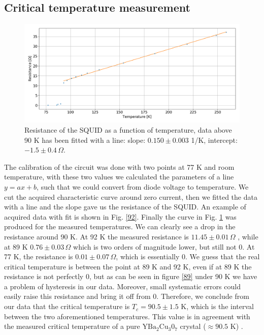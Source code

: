\documentclass[a4paper,10pt]{article}
\begin{document}
\subsection{Critical temperature measurement}
\begin{figure}[H]
\centering
\includegraphics[width = \textwidth]{img/tempR.png}
\caption{Resistance of the SQUID as a function of temperature, data above 90 K has been fitted with a line: slope: $0.150\pm 0.003$ 1/K, intercept: $-1.5\pm0.4\,\Omega$.}\label{resistance}
\end{figure}
The calibration of the circuit was done with two points at 77 K and room temperature, with these two values we calculated the parameters of a line $y=ax+b$, such that we could convert from diode voltage to temperature. We cut the acquired characteristic curve around zero current, then we fitted the data with a line and the slope gave us the resistance of the SQUID. An example of acquired data with fit is shown in Fig. \ref{92}. Finally the curve in Fig. \ref{resistance} was produced for the measured temperatures. We can clearly see a drop in the resistance around 90 K. 
At 92 K the measured resistance is $11.45 \pm  0.01 \, \Omega$ , while at 89 K $0.76\pm 0.03\, \Omega$ which is two orders of magnitude lower, but still not 0. At 77 K, the resistance is
$0.01\pm 0.07\, \Omega$, which is essentially 0. We guess that the real critical temperature is between the point at 89 K and 92 K, even if at 89 K the resistance is not perfectly 0, but as can be seen in figure \ref{89} under 90 K we have a problem of hysteresis in our data. Moreover, small systematic errors could easily raise this resistance and bring it off from 0. Therefore, we conclude from our data that the critical temperature is $T_c = 90.5 \pm 1.5$ K, which is the interval between the two aforementioned temperatures. This value is in agreement with the measured critical temperature of a pure $\text{YBa}_2\text{Cu}_3\text{0}_7$ crystal ($\approx 90.5$ K) \cite{criticaltemperature}.
\end{document}
